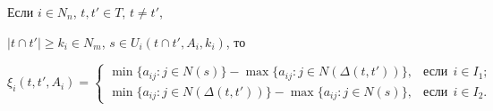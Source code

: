 \begin{lem} \label{lem3}


Если $i\in N_n$, $t,t'\in T$, $t\neq t'$,


$|t\cap t'|\geq k_i\in N_m$, $s\in U_i(t\cap t', A_i, k_i)$, то


\begin{equation}\label{lem3_1}


\xi_i(t, t', A_i)=


\begin{cases}


\min\{a_{ij}: j \in


N(s)\}-\max\{a_{ij}: j \in N(\Delta(t, t'))\}, & \text{если


}\ \ i\in I_1; \\


\min\{a_{ij}: j \in N(\Delta(t, t'))\}-\max\{a_{ij}: j\in


N(s)\}, & \text{если}\ \ i\in I_2.


\end{cases}


\end{equation}


\end{lem}





